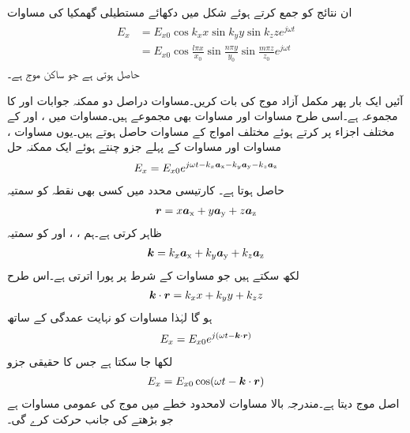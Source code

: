 ان نتائج کو جمع کرتے ہوئے  شکل  میں دکھائے مستطیلی گھمکیا کی مساوات
\begin{gather}
\begin{aligned}
E_x&=E_{x0} \cos k_x x \sin k_y y \sin k_z z e^{j \omega t}\\
&=E_{x0} \cos \frac{l \pi x }{x_0} \sin \frac{n \pi y}{y_0} \sin \frac{m \pi z}{z_0} e^{j \omega t}
\end{aligned}
\end{gather}
حاصل ہوتی ہے جو ساکن موج ہے۔


آئیں ایک بار پھر مکمل آزاد موج کی بات کریں۔مساوات  دراصل دو ممکنہ جوابات  اور  کا مجموعہ ہے۔اسی طرح مساوات   اور مساوات  بھی مجموعے ہیں۔مساوات  میں ،  اور  کے مختلف اجزاء پر کرتے ہوئے مختلف امواج کے مساوات حاصل ہوتے ہیں۔یوں مساوات ، مساوات   اور مساوات  کے پہلے جزو چنتے ہوئے ایک ممکنہ حل
\begin{align}\label{مساوات_مویج_گھمکی_عمومی_ث}
E_x=E_{x0} e^{j \omega t -k_x {\boldsymbol{a}}_{\textup{x}} -k_y {\boldsymbol{a}}_{\textup{y}}-k_z {\boldsymbol{a}}_{\textup{z}}}
\end{align}
حاصل ہوتا ہے۔ کارتیسی محدد میں کسی بھی نقطہ  کو سمتیہ
\begin{align}\label{مساوات_مویج_گھمکی_عمومی_ج}
{\ensuremath{{\boldsymbol{r}}}}=x{\boldsymbol{a}}_{\textup{x}}+y{\boldsymbol{a}}_{\textup{y}}+z{\boldsymbol{a}}_{\textup{z}}
\end{align}
ظاہر کرتی ہے۔ہم ، ،   اور  کو سمتیہ
\begin{align}\label{مساوات_مویج_گھمکی_عمومی_چ}
{\ensuremath{{\boldsymbol{k}}}}=k_x {\boldsymbol{a}}_{\textup{x}}+k_y {\boldsymbol{a}}_{\textup{y}} +k_z {\boldsymbol{a}}_{\textup{z}}
\end{align}
لکھ سکتے ہیں جو مساوات  کے شرط پر پورا اترتی ہے۔اس طرح 
\begin{align}\label{مساوات_مویج_گھمکی_عمومی_ح}
{\ensuremath{{\boldsymbol{k}}}} \cdot {\ensuremath{{\boldsymbol{r}}}}=k_x x +k_y y +k_z z
\end{align}
ہو گا لہٰذا مساوات  کو نہایت عمدگی کے ساتھ
\begin{align}\label{مساوات_مویج_گھمکی_عمومی_خ}
E_x=E_{x0} e^{j(\omega t-{{\boldsymbol{k}}} \cdot {\ensuremath{{\boldsymbol{r}}}})}
\end{align}
لکھا جا سکتا ہے جس کا حقیقی جزو
\begin{align}\label{مساوات_مویج_گھمکی_عمومی_د}
E_x=E_{x0} \cos (\omega t -{{\boldsymbol{k}}} \cdot {\ensuremath{{\boldsymbol{r}}}})
\end{align}
اصل موج دیتا ہے۔مندرجہ بالا مساوات لامحدود خطے میں موج کی عمومی مساوات ہے جو بڑھتے  کی جانب حرکت کرے گی۔

